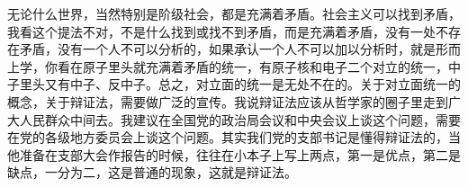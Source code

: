 无论什么世界，当然特别是阶级社会，都是充满着矛盾。社会主义可以找到矛盾，我看这个提法不对，不是什么找到或找不到矛盾，而是充满着矛盾，没有一处不存在矛盾，没有一个人不可以分析的，如果承认一个人不可以加以分析时，就是形而上学，你看在原子里头就充满着矛盾的统一，有原子核和电子二个对立的统一，中子里头又有中子、反中子。总之，对立面的统一是无处不在的。关于对立面统一的概念，关于辩证法，需要做广泛的宣传。我说辩证法应该从哲学家的圈子里走到广大人民群众中间去。我建议在全国党的政治局会议和中央会议上谈这个问题，需要在党的各级地方委员会上谈这个问题。其实我们党的支部书记是懂得辩证法的，当他准备在支部大会作报告的时候，往往在小本子上写上两点，第一是优点，第二是缺点，一分为二，这是普通的现象，这就是辩证法。


